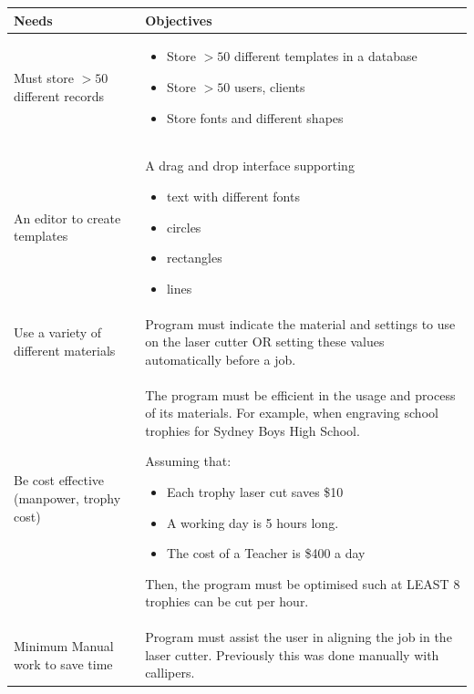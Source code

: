 \documentclass[oneside,openany,11pt,a4paper]{report}
\begin{document}
\begin{longtable}{|p{4cm}|p{10cm}|}
	
   \hline
   \rowcolor{gray!50}
   \textbf{Needs} & \textbf{Objectives} \\ \hline
   
   Must store $>50$ different records & 
	\begin{itemize}
		\itemsep0em
   	\item Store $>50$ different templates in a database
	\item Store $>50$ users, clients 
	\item Store fonts and different shapes 
	
	\end{itemize} \\ \hline

	
	
	An editor to create templates & A drag and drop interface supporting
	\begin{itemize}
		\itemsep0em
		\item text with different fonts
		\item circles
		\item rectangles
		\item lines
	\end{itemize} \\ \hline

	
	Use a variety of different materials & Program must indicate the material and settings to use on the laser cutter OR setting these values automatically before a job. \\ \hline
	
	Be cost effective (manpower, trophy cost) & The program must be efficient in the usage and process of its materials. For example, when engraving school trophies for Sydney Boys High School.\newline

	Assuming that: 
	\begin{itemize}
		\itemsep0em
		\item Each trophy laser cut saves \$10
		\item A working day is 5 hours long.
		\item The cost of a Teacher is \$400 a day
	\end{itemize} 
	Then, the program must be optimised such at LEAST 8 trophies can be cut per hour.\\ \hline
	
	
  Minimum Manual work to save time &  Program must assist the user in aligning the job in the laser cutter. Previously this was done manually with callipers. \\ \hline
  

\end{longtable}
\end{document}
